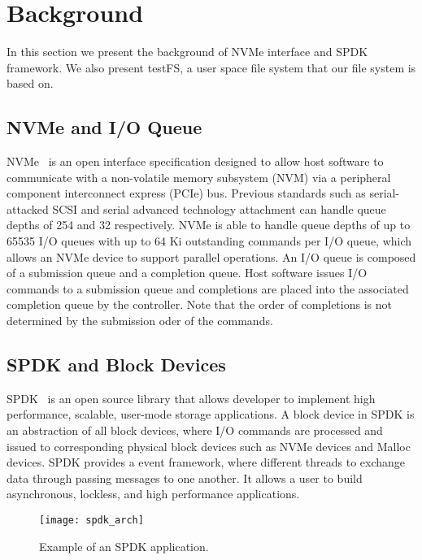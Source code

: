 \section{Background}

In this section we present the background of NVMe interface and SPDK 
framework. We also present testFS, a user space file system that our 
file system is based on.

\subsection{NVMe and I/O Queue}

NVMe~\cite{nvme} is an open interface specification designed to allow host
software to communicate with a non-volatile memory subsystem (NVM) via a 
peripheral component interconnect express (PCIe) bus. Previous standards
such as serial-attacked SCSI and serial advanced technology attachment
can handle queue depths of 254 and 32 respectively. NVMe is able to 
handle queue depths of up to 65535 I/O queues with up to 64 Ki outstanding
commands per I/O queue, which allows an NVMe device to support parallel
operations. An I/O queue is composed of a submission queue and a completion
queue. Host software issues I/O commands to a submission queue and completions
are placed into the associated completion queue by the controller. Note that
the order of completions is not determined by the submission oder of the commands.

\subsection{SPDK and Block Devices}

SPDK~\cite{spdk} is an open source library that allows developer to implement
high performance, scalable, user-mode storage applications. A block device 
in SPDK is an abstraction of all block devices, where I/O commands are 
processed and issued to corresponding physical block devices such as NVMe 
devices and Malloc devices. SPDK provides a event framework, where  
different threads to exchange data through passing messages to one another.
It allows a user to build asynchronous, lockless, and high performance
applications.

\begin{figure}
  \centering
  \texttt{[image: spdk\_arch]}
  \caption{Example of an SPDK application.}
  \label{fig:spdk_arch}
\end{figure}

